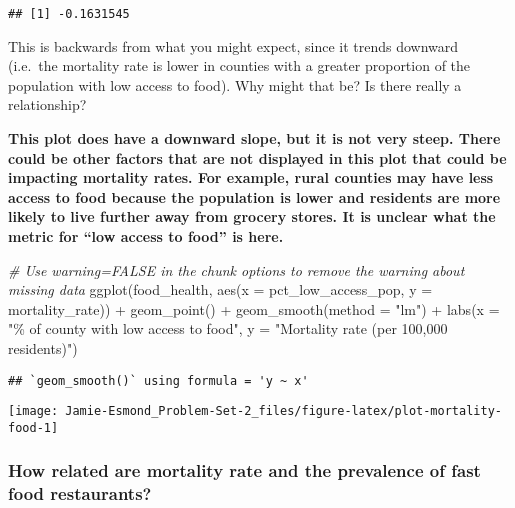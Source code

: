 \documentclass[
]{article}
\newenvironment{Shaded}{\begin{snugshade}}{\end{snugshade}}
\newcommand{\AttributeTok}[1]{\textcolor[rgb]{0.77,0.63,0.00}{#1}}
\newcommand{\CommentTok}[1]{\textcolor[rgb]{0.56,0.35,0.01}{\textit{#1}}}
\newcommand{\FunctionTok}[1]{\textcolor[rgb]{0.00,0.00,0.00}{#1}}
\newcommand{\NormalTok}[1]{#1}
\newcommand{\SpecialCharTok}[1]{\textcolor[rgb]{0.00,0.00,0.00}{#1}}
\newcommand{\StringTok}[1]{\textcolor[rgb]{0.31,0.60,0.02}{#1}}
\begin{document}
\begin{verbatim}
## [1] -0.1631545
\end{verbatim}

This is backwards from what you might expect, since it trends downward
(i.e.~the mortality rate is lower in counties with a greater proportion
of the population with low access to food). Why might that be? Is there
really a relationship?

\textbf{This plot does have a downward slope, but it is not very steep.
There could be other factors that are not displayed in this plot that
could be impacting mortality rates. For example, rural counties may have
less access to food because the population is lower and residents are
more likely to live further away from grocery stores. It is unclear what
the metric for ``low access to food'' is here.}

\begin{Shaded}
\begin{Highlighting}[]
\CommentTok{\# Use warning=FALSE in the chunk options to remove the warning about missing data}
\FunctionTok{ggplot}\NormalTok{(food\_health, }\FunctionTok{aes}\NormalTok{(}\AttributeTok{x =}\NormalTok{ pct\_low\_access\_pop, }\AttributeTok{y =}\NormalTok{ mortality\_rate)) }\SpecialCharTok{+}
  \FunctionTok{geom\_point}\NormalTok{() }\SpecialCharTok{+}
  \FunctionTok{geom\_smooth}\NormalTok{(}\AttributeTok{method =} \StringTok{"lm"}\NormalTok{) }\SpecialCharTok{+}
  \FunctionTok{labs}\NormalTok{(}\AttributeTok{x =} \StringTok{"\% of county with low access to food"}\NormalTok{, }
       \AttributeTok{y =} \StringTok{"Mortality rate (per 100,000 residents)"}\NormalTok{)}
\end{Highlighting}
\end{Shaded}

\begin{verbatim}
## `geom_smooth()` using formula = 'y ~ x'
\end{verbatim}

\begin{center}\texttt{[image: Jamie-Esmond\_Problem-Set-2\_files/figure-latex/plot-mortality-food-1]} \end{center}

\hypertarget{how-related-are-mortality-rate-and-the-prevalence-of-fast-food-restaurants}{%
\subsubsection{How related are mortality rate and the prevalence of fast
food
restaurants?}\label{how-related-are-mortality-rate-and-the-prevalence-of-fast-food-restaurants}}
\end{document}
